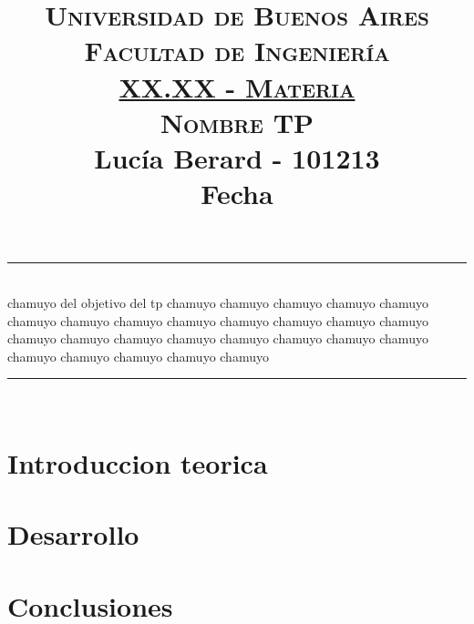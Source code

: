 \documentclass[a4paper]{article}
\begin{document}
	
	
\title{\Huge{\textsc{Universidad de Buenos Aires}}\\
        \vspace*{2mm}
        \huge{\textsc{Facultad de Ingeniería}}\\
        \vspace*{8mm}
        \Huge{\underline{\textsc{XX.XX - Materia}}}\\
        \vspace*{2mm}
        \huge{\textsc{Nombre TP}} \\
        \vspace*{6mm}
        \large{Lucía Berard - 101213}\\
        \vspace*{2mm}
		\large{Fecha}\\
		\date{}
		\vspace{-6mm}
	    }
\maketitle

\begin{center}
    \rule{16cm}{0.1mm}\\
    \vspace*{2mm}
   chamuyo del objetivo del tp chamuyo chamuyo chamuyo chamuyo chamuyo chamuyo chamuyo chamuyo chamuyo chamuyo chamuyo chamuyo chamuyo chamuyo chamuyo chamuyo chamuyo chamuyo chamuyo chamuyo chamuyo chamuyo chamuyo chamuyo chamuyo chamuyo \\
    \vspace*{2mm}
    \rule{16cm}{0.1mm}\\
\end{center}


\tableofcontents

\newpage

\section{Introduccion teorica}
\section{Desarrollo}
\section{Conclusiones}


\end{document}
